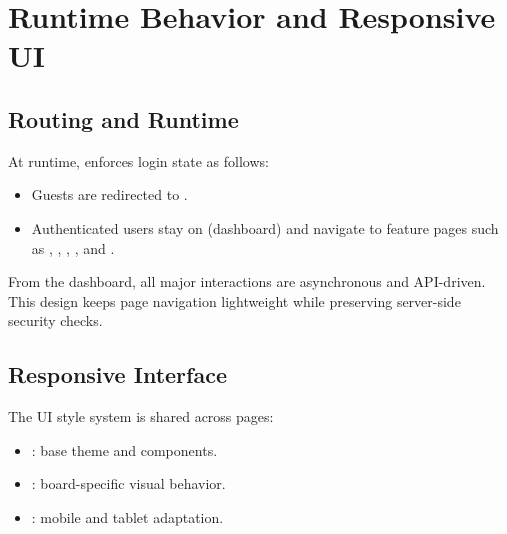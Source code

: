 \section{Runtime Behavior and Responsive UI}

\subsection{Routing and Runtime}

At runtime,  enforces login state as follows:
\begin{itemize}
    \item Guests are redirected to .
    \item Authenticated users stay on  (dashboard) and navigate to feature pages such as , , , , and .
\end{itemize}

From the dashboard, all major interactions are asynchronous and API-driven.
This design keeps page navigation lightweight while preserving server-side security checks.

\subsection{Responsive Interface}

The UI style system is shared across pages:
\begin{itemize}
    \item {}: base theme and components.
    \item {}: board-specific visual behavior.
    \item {}: mobile and tablet adaptation.
\end{itemize}

